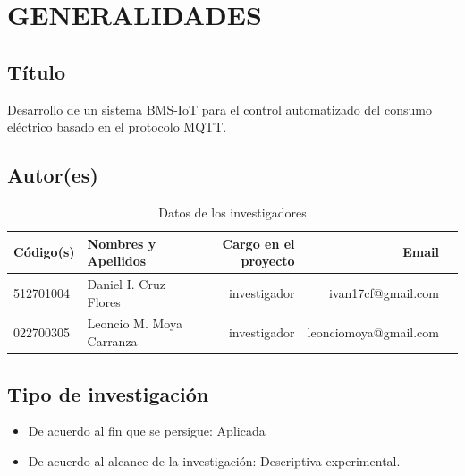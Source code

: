 \documentclass[a4paper, 12pt]{article}
\begin{document}
\section{GENERALIDADES}



\subsection{Título}
Desarrollo de un sistema BMS-IoT para el control automatizado del consumo eléctrico basado en el protocolo MQTT.

\subsection{Autor(es)}
\begin{table}[h!]
 \caption{\small{Datos de los investigadores}}
\begin{tabular}{llrrr} \toprule
{\bf Código(s)} & {\bf Nombres y Apellidos} & {\bf Cargo en el proyecto} & {\bf Email} \\ \midrule
512701004 & Daniel I. Cruz Flores & investigador  & ivan17cf@gmail.com \\
022700305    & Leoncio M. Moya Carranza & investigador  & leonciomoya@gmail.com            \\ \bottomrule
\end{tabular}
\end{table}



\subsection{Tipo de investigación}

\begin{itemize}
\item De acuerdo al fin que se persigue: Aplicada 
\item De acuerdo al alcance de  la investigación: Descriptiva experimental.
\end{itemize}
\end{document}
